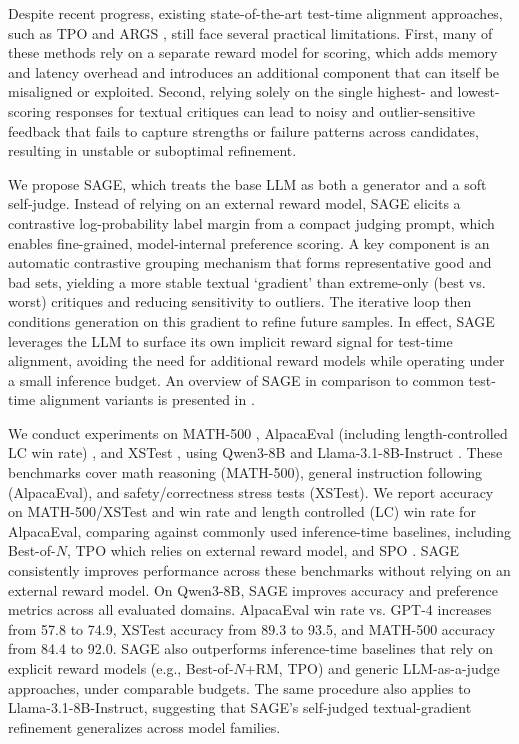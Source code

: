 \documentclass[letterpaper]{article} %
\newcommand{\method}{SAGE}
\begin{document}
Despite recent progress, existing state-of-the-art test-time alignment approaches, such as TPO \cite{litest} and ARGS \cite{khanov2024args}, still face several practical limitations. First, many of these methods rely on a separate reward model for scoring, which adds memory and latency overhead and introduces an additional component that can itself be misaligned or exploited. Second, relying solely on the single highest- and lowest-scoring responses for textual critiques can lead to noisy and outlier-sensitive feedback that fails to capture strengths or failure patterns across candidates, resulting in unstable or suboptimal refinement.


We propose \method{}, which treats the base LLM as both a generator and a soft self-judge. Instead of relying on an external reward model, \method{} elicits a contrastive log-probability label margin from a compact judging prompt, which enables fine-grained, model-internal preference scoring. A key component is an automatic contrastive grouping mechanism that forms representative good and bad sets, yielding a more stable textual `gradient' than extreme-only (best vs. worst) critiques and reducing sensitivity to outliers. The iterative loop then conditions generation on this gradient to refine future samples. In effect, \method{} leverages the LLM to surface its own implicit reward signal for test-time alignment, avoiding the need for additional reward models while operating under a small inference budget. An overview of \method{} in comparison to common test-time alignment variants is presented in .


We conduct experiments on MATH-500 \citep{hendrycks2measuring}, AlpacaEval (including length-controlled LC win rate) \citep{dubois2024length}, and XSTest \citep{rottger2024xstest}, using Qwen3-8B \citep{yang2025qwen3} and Llama-3.1-8B-Instruct \citep{grattafiori2024llama}. These benchmarks cover math reasoning (MATH-500), general instruction following (AlpacaEval), and safety/correctness stress tests (XSTest). We report accuracy on MATH-500/XSTest and win rate and length controlled (LC) win rate for AlpacaEval, comparing against commonly used inference-time baselines, including Best-of-\(N\), TPO \citep{litest} which relies on external reward model, and SPO \citep{xiang2025self}.
\method{} consistently improves performance across these benchmarks without relying on an external reward model. On Qwen3-8B, \method{} improves accuracy and preference metrics across all evaluated domains. AlpacaEval win rate vs. GPT-4 increases from 57.8 to 74.9, XSTest accuracy from 89.3 to 93.5, and MATH-500 accuracy from 84.4 to 92.0. \method{} also outperforms inference-time baselines that rely on explicit reward models (e.g., Best-of-\(N\)+RM, TPO) and generic LLM-as-a-judge approaches, under comparable budgets. The same procedure also applies to Llama-3.1-8B-Instruct, suggesting that \method{}’s self-judged textual-gradient refinement generalizes across model families.
\end{document}
